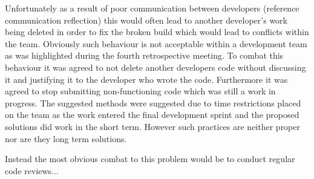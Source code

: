 \documentclass{l3proj}
\begin{document}
Unfortunately as a result of poor communication between developers (reference communication reflection) this would often lead to another developer's work being deleted in order to fix the broken build which would lead to conflicts within the team. Obviously such behaviour is not acceptable within a development team as was highlighted during the fourth retrospective meeting. To combat this behaviour it was agreed to not delete another developers code without discussing it and justifying it to the developer who wrote the code. Furthermore it was agreed to stop submitting non-functioning code which was still a work in progress. The suggested methods were suggested due to time restrictions placed on the team as the work entered the final development sprint and the proposed solutions did work in the short term. However such practices are neither proper nor are they long term solutions. 

Instead the most obvious combat to this problem would be to conduct regular code reviews...

\end{document}
